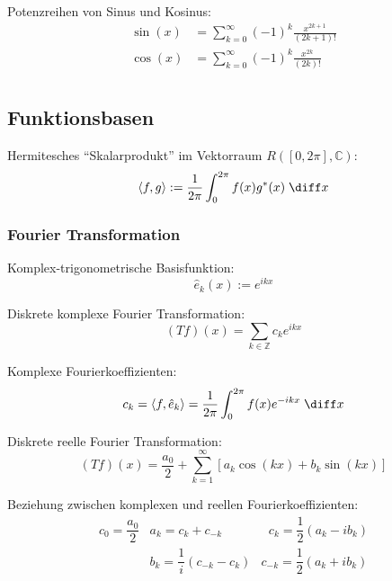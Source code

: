 \documentclass[11pt]{article}
\numberwithin{equation}{section}
\begin{document}
          Potenzreihen von Sinus und Kosinus:
          \begin{equation}
            \begin{aligned}
              \sin(x) &= \sum_{k=0}^\infty (-1)^k \frac{x^{2k+1}}{(2k+1)!} \\
              \cos(x) &= \sum_{k=0}^\infty (-1)^k \frac{x^{2k}}{(2k)!} \\
            \end{aligned}
          \end{equation}

    \subsection{Funktionsbasen}
      Hermitesches ``Skalarprodukt'' im Vektorraum $R([0,2\pi],\mathbb{C})$:
      \begin{equation}
        \left<f,g\right>:=\frac{1}{2\pi}\int_0^{2\pi} f(x)g^* (x)\;\diff x
      \end{equation}

      \subsubsection{Fourier Transformation}
        Komplex-trigonometrische Basisfunktion:
        \begin{equation}
          \hat{e}_k(x):=e^{ikx}
        \end{equation}

        Diskrete komplexe Fourier Transformation:
        \begin{equation}
          (Tf)(x)=\sum_{k\in\mathbb{Z}}c_k e^{ikx}
        \end{equation}

        Komplexe Fourierkoeffizienten:
        \begin{equation}
          c_k = \left<f,\hat{e}_k\right>=\frac{1}{2\pi}\int_0^{2\pi}f(x)e^{-ikx}\;\diff x
        \end{equation}

        Diskrete reelle Fourier Transformation:
        \begin{equation}
          (Tf)(x)=\frac{a_0}{2}+\sum_{k=1}^{\infty}\left[a_k \cos(kx) + b_k \sin(kx) \right]
        \end{equation}

        Beziehung zwischen komplexen und reellen Fourierkoeffizienten:
        \begin{equation}
          \begin{array}{clc}
            c_0 = \dfrac{a_0}{2} & a_k = c_k+c_{-k} & \phantom{_{-}}c_k = \dfrac{1}{2}\left(a_k-ib_k\right) \\ [6pt]
            & b_k = \dfrac{1}{i}\left(c_{-k}-c_{k}\right) & c_{-k} = \dfrac{1}{2}\left(a_k+ib_k\right) \\
          \end{array}
        \end{equation}
\end{document}
